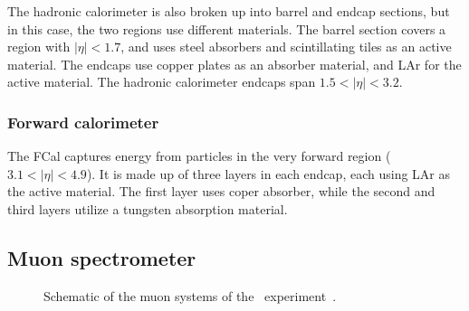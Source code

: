 The hadronic calorimeter is also broken up into barrel and endcap sections, but
in this case, the two regions use different materials.
The barrel section covers a region with $|\eta| < 1.7$, and uses steel
absorbers and scintillating tiles as an active material.
The endcaps use copper plates as an absorber material, and LAr for the active
material.
The hadronic calorimeter endcaps span $1.5 < |\eta| < 3.2$.

\FloatBarrier
\subsubsection{Forward calorimeter} 
\label{sec:fcal}

The FCal captures energy from particles in the very forward region
($3.1 < |\eta| < 4.9$).
It is made up of three layers in each endcap, each using LAr as the active
material.
The first layer uses coper absorber, while the second and third layers utilize
a tungsten absorption material.

\FloatBarrier
\subsection{Muon spectrometer} 
\label{sec:ms}

\begin{figure}[ht]
  \caption{
    Schematic of the muon systems of the
    \atlas\ experiment~\cite{Pequenao:1095929}.
  }
  \label{fig:ms_cartoon}
\end{figure}

